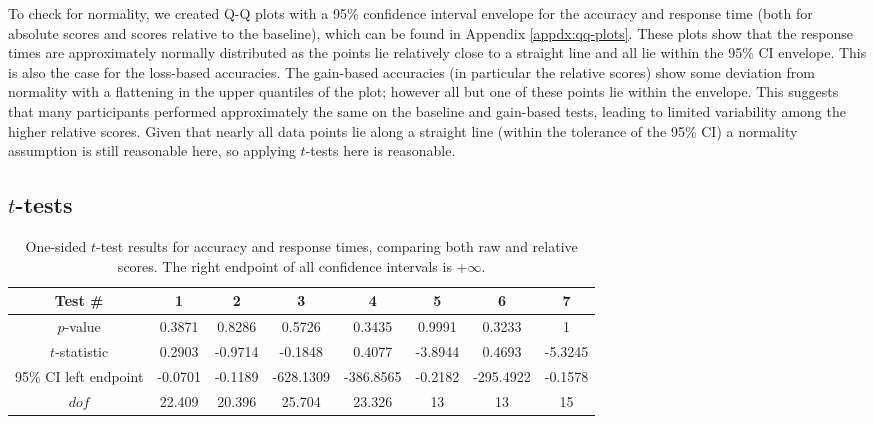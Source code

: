 \documentclass[12pt]{exam}
\begin{document}
To check for normality, we created Q-Q plots with a 95\% confidence interval envelope for the accuracy and response time (both for absolute scores and scores relative to the baseline), which can be found in Appendix \ref{appdx:qq-plots}. These plots show that the response times are approximately normally distributed as the points lie relatively close to a straight line and all lie within the 95\% CI envelope. This is also the case for the loss-based accuracies. The gain-based accuracies (in particular the relative scores) show some deviation from normality with a flattening in the upper quantiles of the plot; however all but one of these points lie within the envelope. This suggests that many participants performed approximately the same on the baseline and gain-based tests, leading to limited variability among the higher relative scores. Given that nearly all data points lie along a straight line (within the tolerance of the 95\% CI) a normality assumption is still reasonable here, so applying $t$-tests here is reasonable.

\subsection{$t$-tests}

\begin{table}[H]
    \centering
    \caption{One-sided $t$-test results for accuracy and response times, comparing both raw and relative scores. The right endpoint of all confidence intervals is +$\infty$.}
    \begin{tabular}{|c|c|c|c|c|c|c|c|}
    \hline
        Test \# & 1 & 2 & 3 & 4 & 5 & 6 & 7\\ 
    \hline
        $p$-value & 0.3871 & 0.8286 & 0.5726 & 0.3435 & 0.9991 & 0.3233 & 1 \\
    \hline
        $t$-statistic & 0.2903 & -0.9714 & -0.1848 & 0.4077 & -3.8944 & 0.4693 & -5.3245 \\
    \hline
        95\% CI left endpoint & -0.0701 & -0.1189 & -628.1309 & -386.8565 & -0.2182 & -295.4922  & -0.1578 \\
    \hline
        $dof$ & 22.409  & 20.396 & 25.704 & 23.326 & 13 & 13 & 15\\
    \hline
    \end{tabular}
    \label{tab:one-sided-t-test-results}
\end{table}
\end{document}
